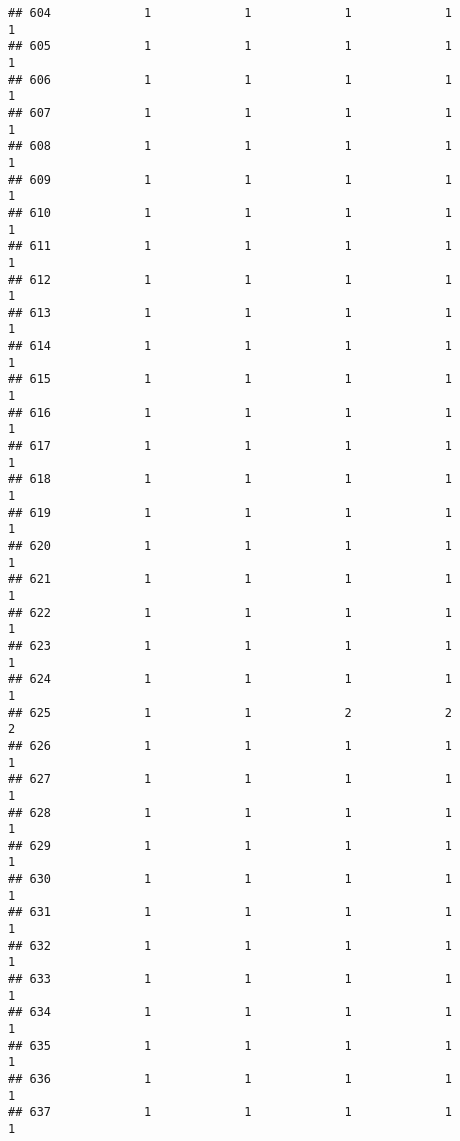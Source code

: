 \documentclass[
]{article}
\begin{document}
\begin{verbatim}
## 604             1             1             1             1             1
## 605             1             1             1             1             1
## 606             1             1             1             1             1
## 607             1             1             1             1             1
## 608             1             1             1             1             1
## 609             1             1             1             1             1
## 610             1             1             1             1             1
## 611             1             1             1             1             1
## 612             1             1             1             1             1
## 613             1             1             1             1             1
## 614             1             1             1             1             1
## 615             1             1             1             1             1
## 616             1             1             1             1             1
## 617             1             1             1             1             1
## 618             1             1             1             1             1
## 619             1             1             1             1             1
## 620             1             1             1             1             1
## 621             1             1             1             1             1
## 622             1             1             1             1             1
## 623             1             1             1             1             1
## 624             1             1             1             1             1
## 625             1             1             2             2             2
## 626             1             1             1             1             1
## 627             1             1             1             1             1
## 628             1             1             1             1             1
## 629             1             1             1             1             1
## 630             1             1             1             1             1
## 631             1             1             1             1             1
## 632             1             1             1             1             1
## 633             1             1             1             1             1
## 634             1             1             1             1             1
## 635             1             1             1             1             1
## 636             1             1             1             1             1
## 637             1             1             1             1             1

\end{verbatim}
\end{document}
